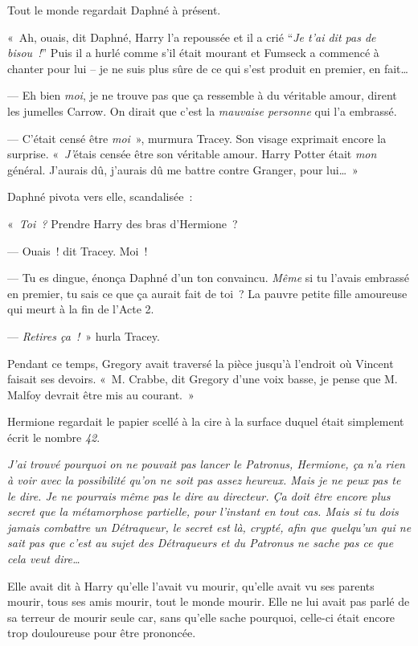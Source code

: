 Tout le monde regardait Daphné à présent.

«~Ah, ouais, dit Daphné, Harry l'a repoussée et il a crié “\emph{Je t'ai dit pas de bisou~!}” Puis il a hurlé comme s'il était mourant et Fumseck a commencé à chanter pour lui -- je ne suis plus sûre de ce qui s'est produit en premier, en fait…

--- Eh bien \emph{moi}, je ne trouve pas que ça ressemble à du véritable amour, dirent les jumelles Carrow. On dirait que c'est la \emph{mauvaise personne} qui l'a embrassé.

--- C'était censé être \emph{moi}~», murmura Tracey. Son visage exprimait encore la surprise. «~\emph{J'}étais censée être son véritable amour. Harry Potter était \emph{mon} général. J'aurais dû, j'aurais dû me battre contre Granger, pour lui…~»

Daphné pivota vers elle, scandalisée~:

«~\emph{Toi~?} Prendre Harry des bras d'Hermione~?

--- Ouais~! dit Tracey. Moi~!

--- Tu es dingue, énonça Daphné d'un ton convaincu. \emph{Même} si tu l'avais embrassé en premier, tu sais ce que ça aurait fait de toi~? La pauvre petite fille amoureuse qui meurt à la fin de l'Acte 2.

--- \emph{Retires ça~!}~» hurla Tracey.

Pendant ce temps, Gregory avait traversé la pièce jusqu'à l'endroit où Vincent faisait ses devoirs. «~M. Crabbe, dit Gregory d'une voix basse, je pense que M. Malfoy devrait être mis au courant.~»


Hermione regardait le papier scellé à la cire à la surface duquel était simplement écrit le nombre \emph{42}.

\emph{J'ai trouvé pourquoi on ne pouvait pas lancer le Patronus, Hermione, ça n'a rien à voir avec la possibilité qu'on ne soit pas assez heureux. Mais je ne peux pas te le dire. Je ne pourrais même pas le dire au directeur. Ça doit être encore plus secret que la métamorphose partielle, pour l'instant en tout cas. Mais si tu dois jamais combattre un Détraqueur, le secret est là, crypté, afin que quelqu'un qui ne sait pas que c'est au sujet des Détraqueurs et du Patronus ne sache pas ce que cela veut dire…}

Elle avait dit à Harry qu'elle l'avait vu mourir, qu'elle avait vu ses parents mourir, tous ses amis mourir, tout le monde mourir. Elle ne lui avait pas parlé de sa terreur de mourir seule car, sans qu'elle sache pourquoi, celle-ci était encore trop douloureuse pour être prononcée.

